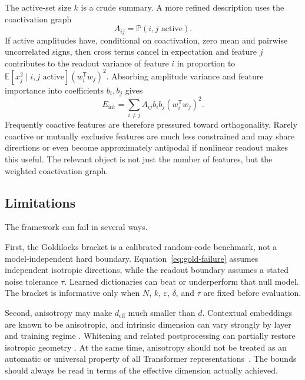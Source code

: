\documentclass[
  aps,
  reprint,
  superscriptaddress,
  floatfix,
  nofootinbib,
  longbibliography
]{revtex4-2}
\newcommand{\E}{\mathbb{E}}
\newcommand{\Prob}{\mathbb{P}}
\newcommand{\deff}{d_{\mathrm{eff}}}
\newcommand{\Eint}{E_{\mathrm{int}}}
\newcommand{\T}{^{\mathsf{T}}}
\begin{document}
The active-set size $k$ is a crude summary. A more refined description
uses the coactivation graph
%
\begin{equation}
\label{eq:coactivation}
A_{ij}=\Prob(i,j\text{ active}).
\end{equation}
%
If active amplitudes have, conditional on coactivation, zero mean and
pairwise uncorrelated signs, then cross terms cancel in expectation and
feature $j$ contributes to the readout variance of feature $i$ in
proportion to
$\E[x_j^2\mid i,j\text{ active}](w_i\T w_j)^2$. Absorbing amplitude
variance and feature importance into coefficients $b_i,b_j$ gives
%
\begin{equation}
\label{eq:int-energy}
\Eint=
\sum_{i\neq j}
A_{ij}b_i b_j (w_i\T w_j)^2 .
\end{equation}
%
Frequently coactive features are therefore pressured toward
orthogonality. Rarely coactive or mutually exclusive features are much
less constrained and may share directions or even become approximately
antipodal if nonlinear readout makes this useful. The relevant object
is not just the number of features, but the weighted coactivation graph.

\subsection{Limitations}
\label{sec:limitations}

The framework can fail in several ways.

First, the Goldilocks bracket is a calibrated random-code benchmark, not a
model-independent hard boundary.  Equation~\eqref{eq:gold-failure} assumes
independent isotropic directions, while the readout boundary assumes a stated
noise tolerance $\tau$.  Learned dictionaries can beat or underperform that
null model.  The bracket is informative only when $N$, $k$, $\varepsilon$,
$\delta$, and $\tau$ are fixed before evaluation.

Second, anisotropy may make $\deff$ much smaller than $d$.
Contextual embeddings are known to be anisotropic, and intrinsic
dimension can vary strongly by layer and training regime
\cite{ethayarajh2019,gao2019representation,mu2018allbutthetop,razzhigaev2024shape}. Whitening and
related postprocessing can partially restore isotropic geometry
\cite{gao2019representation,mu2018allbutthetop,su2021whitening}. At the same time, anisotropy should not
be treated as an automatic or universal property of all Transformer
representations~\cite{machina2024anisotropy}. The bounds should always
be read in terms of the effective dimension actually achieved.
\end{document}
